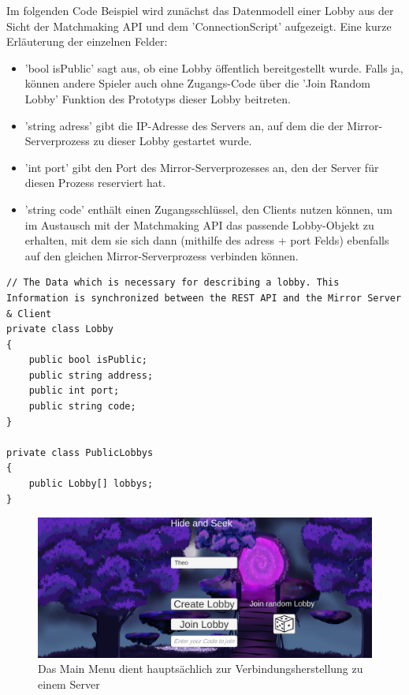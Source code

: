Im folgenden Code Beispiel wird zunächst das Datenmodell einer Lobby aus der Sicht der Matchmaking API und dem 'ConnectionScript' aufgezeigt. Eine kurze Erläuterung der einzelnen Felder:

\begin{itemize}
	\item 'bool isPublic' sagt aus, ob eine Lobby öffentlich bereitgestellt wurde. Falls ja, können andere Spieler auch ohne Zugangs-Code über die 'Join Random Lobby' Funktion des Prototyps dieser Lobby beitreten.
	\item 'string adress' gibt die IP-Adresse des Servers an, auf dem die der Mirror-Serverprozess zu dieser Lobby gestartet wurde.
	\item 'int port' gibt den Port des Mirror-Serverprozesses an, den der Server für diesen Prozess reserviert hat.
	\item 'string code' enthält einen Zugangsschlüssel, den Clients nutzen können, um im Austausch mit der Matchmaking API das passende Lobby-Objekt zu erhalten, mit dem sie sich dann (mithilfe des adress + port Felds) ebenfalls auf den gleichen Mirror-Serverprozess verbinden können.
\end{itemize}

\begin{lstlisting}[caption= ConnectionScript.cs Matchmaking Data]
// The Data which is necessary for describing a lobby. This Information is synchronized between the REST API and the Mirror Server & Client
private class Lobby
{
	public bool isPublic;
	public string address;
	public int port;
	public string code;
}

private class PublicLobbys
{
	public Lobby[] lobbys;
}
\end{lstlisting}

\begin{figure}[H]
	\centering
	\includegraphics[width=120mm]{images/prototyp_main_menu.png}
	\caption[Prototyp Main Menu]{Das Main Menu dient hauptsächlich zur Verbindungsherstellung zu einem Server}
	\label{pic:prototyp_main_menu}
\end{figure}

